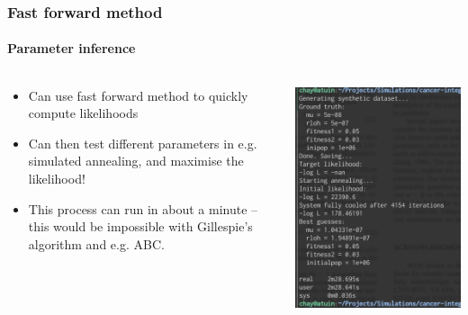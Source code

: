 \documentclass{beamer}
\begin{document}
\begin{frame}
    \frametitle{Fast forward method}
    \framesubtitle{Parameter inference}

    \begin{columns}
        \begin{column}{0.5\textwidth}
        \begin{itemize}
            \item Can use fast forward method to quickly compute likelihoods
            \item Can then test different parameters in e.g. simulated annealing, and maximise the likelihood!
            \item This process can run in about a minute -- this would be impossible with
        Gillespie's algorithm and e.g. ABC.
        \end{itemize}
        \end{column}
        \begin{column}{0.5\textwidth}
            \includegraphics[width=1.0\textwidth]{figures/maxlikelihood.png}
        \end{column}
    \end{columns}
\end{frame}
\end{document}
